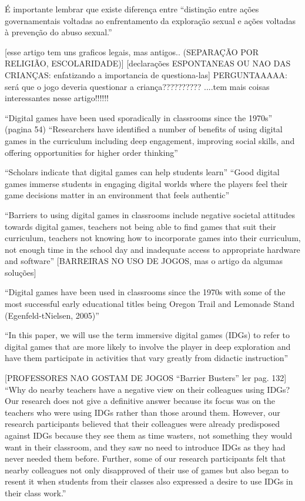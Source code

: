 É importante lembrar que existe diferença entre ``distinção entre ações governamentais voltadas ao enfrentamento da exploração sexual e ações voltadas à prevenção do abuso sexual.''  \cite{caccia2014conselheiros}



[esse artigo tem uns graficos legais, mas antigos.. (SEPARAÇÃO POR RELIGIÃO, ESCOLARIDADE)] [declarações ESPONTANEAS OU NAO DAS CRIANÇAS: enfatizando a importancia de questiona-las] PERGUNTAAAAA: será que o jogo deveria questionar a criança?????????? \cite{cardoso2016abuso} ....tem mais coisas interessantes nesse artigo!!!!!!


``Digital games have been used sporadically in classrooms since the 1970s'' (pagina 54) \cite{dip2016advancing}
``Researchers have identified a number of benefits of using digital games in the curriculum including deep engagement, improving social skills, and offering opportunities for higher order thinking''\cite{dip2016advancing}

``Scholars indicate that digital games can help students learn'' ``Good digital games immerse students in engaging digital worlds where the players feel their game decisions matter in an environment that feels authentic'' \cite{dip2016advancing}

``Barriers to using digital games in classrooms include negative societal attitudes towards digital games, teachers not being able to find games that suit their curriculum, teachers not knowing how to incorporate games into their curriculum, not enough time in the school day and inadequate access to appropriate hardware and software'' [BARREIRAS NO USO DE JOGOS, mas o artigo da algumas soluções] \cite{dip2016advancing}

``Digital games have been used in classrooms since the 1970s with some of the most successful early educational titles being Oregon Trail and Lemonade Stand (Egenfeld-tNielsen, 2005)''\cite{dip2016advancing}

``In this paper, we will use the term immersive digital games (IDGs) to refer to digital games that are more likely to involve the player in deep exploration and have them participate in activities that vary greatly from didactic instruction'' \cite{dip2016advancing}

[PROFESSORES NAO GOSTAM DE JOGOS “Barrier Busters” ler pag. 132]
``Why do nearby teachers have a negative view on their colleagues using IDGs? Our research does not give a definitive answer because its focus was on the teachers who were using IDGs rather than those around them. However, our research participants believed that their colleagues were already predisposed against IDGs because they see them as time wasters, not something they would want in their classroom, and they saw no need to introduce IDGs as they had never needed them before. Further, some of our research participants felt that nearby colleagues not only disapproved of their use of games but also began to resent it when students from their classes also expressed a desire to use IDGs in their class work.''\cite{dip2016advancing}

